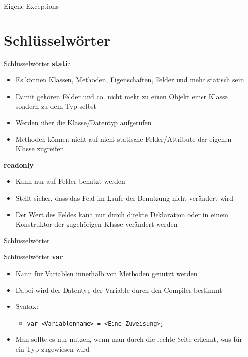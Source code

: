 \begin{frame}{Eigene Exceptions}
	
\end{frame}

\section{Schlüsselwörter}
\begin{frame}{Schlüsselwörter}
	\textbf{static}\\
	\begin{itemize}
		\item Es können Klassen, Methoden, Eigenschaften, Felder und mehr statisch sein
		\item Damit gehören Felder und co. nicht mehr zu einen Objekt einer Klasse sondern zu dem Typ selbst 
		\item Werden über die Klasse/Datentyp aufgerufen
		\item Methoden können nicht auf nicht-statische Felder/Attribute der eigenen Klasse zugreifen
	\end{itemize}
	\textbf{readonly}\\
	\begin{itemize}
		\item Kann nur auf Felder benutzt werden
		\item Stellt sicher, dass das Feld im Laufe der Benutzung nicht verändert wird
		\item Der Wert des Feldes kann nur durch direkte Deklaration oder in einem Konstruktor der zugehörigen Klasse verändert werden
	\end{itemize}
\end{frame}

\begin{frame}{Schlüsselwörter}
	
\end{frame}

\begin{frame}{Schlüsselwörter}
	\textbf{var}\\
	\begin{itemize}
		\item Kann für Variablen innerhalb von Methoden genutzt werden
		\item Dabei wird der Datentyp der Variable durch den Compiler bestimmt
		\item Syntax:
		\begin{itemize}
			\item \texttt{var \alert{<Variablenname>} = \alert{<Eine Zuweisung>};}
		\end{itemize}
		\item Man sollte es nur nutzen, wenn man durch die rechte Seite erkennt, was für ein Typ zugewiesen wird
	\end{itemize}
	
\end{frame}


